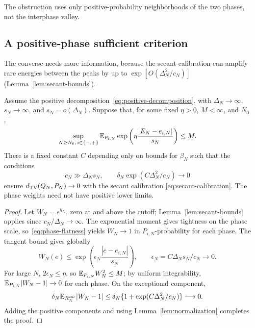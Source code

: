The obstruction uses only positive-probability neighborhoods of the
two phases, not the interphase valley.

\subsection{A positive-phase sufficient criterion}

The converse needs more information, because the secant calibration
can amplify rare energies between the peaks by up to
$\exp[O(\Delta_N^2/c_N)]$ (Lemma~\ref{lem:secant-bounds}).

\begin{theorem}
\label{thm:positive-sufficiency}
Assume the positive decomposition~\eqref{eq:positive-decomposition},
with $\Delta_N\to\infty$, $s_N\to\infty$, and
$s_N=o(\Delta_N)$. Suppose that, for some fixed $\eta>0$, $M<\infty$,
and $N_0$,
\begin{equation}
 \sup_{N\ge N_0,\,i\in\{-,+\}}
 \mathbb E_{P_{i,N}}\exp\left(\eta\frac{|E_N-e_{i,N}|}{s_N}\right)\le M.
 \label{eq:phase-exponential-moment}
\end{equation}
There is a fixed constant $C$ depending only on bounds for $\beta_N$
such that the conditions
\begin{equation}
 c_N\gg\Delta_Ns_N,
 \qquad
 \delta_N\exp(C\Delta_N^2/c_N)\longrightarrow0
 \label{eq:mixture-sufficient-conditions}
\end{equation}
ensure $d_{\mathrm{TV}}(Q_N,P_N)\to0$ with the secant calibration
\eqref{eq:secant-calibration}. The phase weights need not have
positive lower limits.
\end{theorem}
\begin{proof}
Let $W_N=e^{h_N}$, zero at and above the cutoff;
Lemma~\ref{lem:secant-bounds} applies since $c_N/\Delta_N\to\infty$.
The exponential moment gives tightness on the phase scale,
so~\eqref{eq:phase-flatness} yields $W_N\to1$ in
$P_{i,N}$-probability for each phase. The tangent bound gives globally
\[
 W_N(e)\le
 \exp\left(\epsilon_N\frac{|e-e_{i,N}|}{s_N}\right),\qquad
 \epsilon_N=C\Delta_Ns_N/c_N\longrightarrow0.
\]
For large $N$, $2\epsilon_N\le\eta$, so
$\mathbb E_{P_{i,N}}W_N^2\le M$; by uniform integrability,
$\mathbb E_{P_{i,N}}|W_N-1|\to0$ for each phase. On the exceptional
component,
\[
 \delta_N\mathbb E_{R_N^{\mathrm{exc}}}|W_N-1|
 \le\delta_N\{1+\exp(C\Delta_N^2/c_N)\}\longrightarrow0.
\]
Adding the positive components and using
Lemma~\ref{lem:normalization} completes the proof.
\end{proof}

